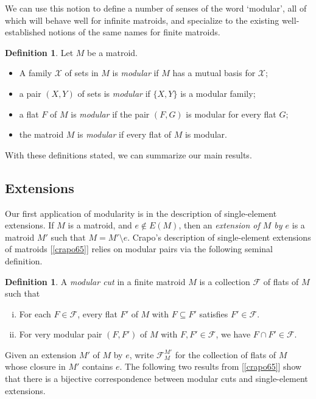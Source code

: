 \documentclass{amsart}
\theoremstyle{plain}
\newcounter{defn}
\theoremstyle{definition}
\newtheorem{definition}[defn]{Definition}
\newcommand{\cF}{\mathcal{F}}
\newcommand{\cX}{\mathcal{X}}
\newcommand{\del}{\!\setminus\!}
\begin{document}
We can use this notion to define a number of senses of the word `modular', 
all of which will behave well for infinite matroids, 
and specialize to the existing well-established notions of the same names for finite matroids. 

\begin{definition}\label{modpairdef}
  Let $M$ be a matroid. 
  \begin{itemize}
    \item A family $\cX$ of sets in $M$ is \emph{modular} if $M$ has a mutual basis for $\cX$;
    \item a pair $(X,Y)$ of sets is \emph{modular} if $\{X,Y\}$ is a modular family;
    \item a flat $F$ of $M$ is \emph{modular} if the pair $(F,G)$ is modular for every flat $G$;
    \item the matroid $M$ is \emph{modular} if every flat of $M$ is modular. 
  \end{itemize} 
\end{definition}
 

With these definitions stated, we can summarize our main results. 

\subsection*{Extensions}
Our first application of modularity is in the description of single-element extensions. 
If $M$ is a matroid, and $e \notin E(M)$, then an \emph{extension of $M$ by $e$}
is a matroid $M'$ such that $M = M' \del e$. 
Crapo's description of single-element extensions of matroids [\ref{crapo65}] relies on modular pairs 
via the following seminal definition.

\begin{definition}\label{finmodcut}
A \emph{modular cut} in a finite matroid $M$ is a collection $\cF$ of flats of $M$
such that
\begin{enumerate}[(i)]
  \item\label{finsuperflat} 
    For each $F \in \cF$, every flat $F'$ of $M$ with $F \subseteq F'$ satisfies $F' \in \cF$. 
  \item\label{forallfinmodpair} 
    For very modular pair $(F,F')$ of $M$ with $F, F' \in \cF$, we have $F \cap F' \in \cF$. 
\end{enumerate}
\end{definition}

Given an extension $M'$ of $M$ by $e$, 
write $\cF_M^{M'}$ for the collection of flats of $M$ whose closure in $M'$ contains $e$. 
The following two results from [\ref{crapo65}] 
show that there is a bijective correspondence between modular cuts and 
single-element extensions. 
\end{document}
